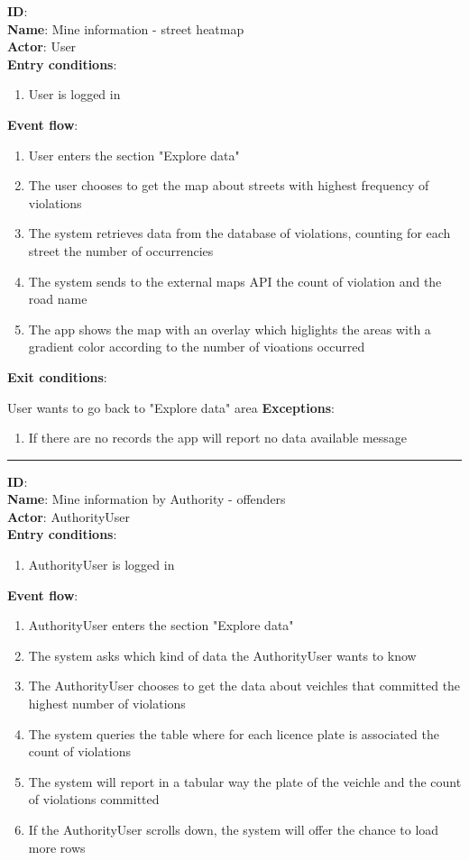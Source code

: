 	\textbf{ID}:  \\
	\textbf{Name}: Mine information - street heatmap \\
	\textbf{Actor}: User  \\
	\textbf{Entry conditions}:
	\begin{enumerate}
		\item{User is logged in}
	\end{enumerate}
	\textbf{Event flow}:
	\begin{enumerate}
		\item{User enters the section "Explore data"}
    \item{The user chooses to get the map about streets with highest frequency of violations}
    \item{The system retrieves data from the database of violations, counting for each street the number of occurrencies}
    \item{The system sends to the external maps API the count of violation and the road name}
    \item{The app shows the map with an overlay which higlights the areas with a gradient color according to the number of vioations occurred}
	\end{enumerate}
	\textbf{Exit conditions}:
        \item{User wants to go back to "Explore data" area}
	\textbf{Exceptions}:
  \begin{enumerate}
    \item{If there are no records the app will report no data available message}
  \end{enumerate}
	\rule{\linewidth}{0.4pt}
	\textbf{ID}:  \\
	\textbf{Name}: Mine information by Authority - offenders \\
	\textbf{Actor}: AuthorityUser   \\
	\textbf{Entry conditions}:
	\begin{enumerate}
		\item{AuthorityUser is logged in}
	\end{enumerate}
	\textbf{Event flow}:
	\begin{enumerate}
		\item{AuthorityUser enters the section "Explore data"}
		\item{The system asks which kind of data the AuthorityUser wants to know}
    \item{The AuthorityUser chooses to get the data about veichles that committed the highest number of violations}
    \item{The system queries the table where for each licence plate is associated the count of violations }
    \item{The system will report in a tabular way the plate of the veichle and the count of violations committed}
    \item{If the AuthorityUser scrolls down, the system will offer the chance to load more rows}
	\end{enumerate}
